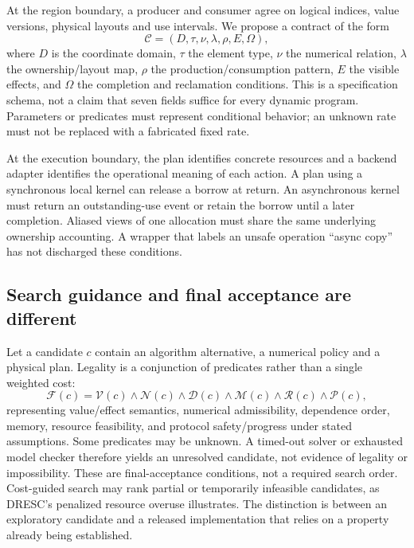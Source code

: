 \documentclass[final,3p,times,authoryear]{elsarticle}
\begin{document}
At the region boundary, a producer and consumer agree on logical indices, value versions, physical layouts and use intervals. We propose a contract of the form
\begin{equation}
 \mathcal C=(D,\tau,\nu,\lambda,\rho,E,\Omega),
\end{equation}
where $D$ is the coordinate domain, $\tau$ the element type, $\nu$ the numerical relation, $\lambda$ the ownership/layout map, $\rho$ the production/consumption pattern, $E$ the visible effects, and $\Omega$ the completion and reclamation conditions. This is a specification schema, not a claim that seven fields suffice for every dynamic program. Parameters or predicates must represent conditional behavior; an unknown rate must not be replaced with a fabricated fixed rate.

At the execution boundary, the plan identifies concrete resources and a backend adapter identifies the operational meaning of each action. A plan using a synchronous local kernel can release a borrow at return. An asynchronous kernel must return an outstanding-use event or retain the borrow until a later completion. Aliased views of one allocation must share the same underlying ownership accounting. A wrapper that labels an unsafe operation ``async copy'' has not discharged these conditions.

\subsection{Search guidance and final acceptance are different}
Let a candidate $c$ contain an algorithm alternative, a numerical policy and a physical plan. Legality is a conjunction of predicates rather than a single weighted cost:
\begin{equation}
 \mathcal F(c)=\mathcal V(c)\land\mathcal N(c)\land\mathcal D(c)
 \land\mathcal M(c)\land\mathcal R(c)\land\mathcal P(c),
\end{equation}
representing value/effect semantics, numerical admissibility, dependence order, memory, resource feasibility, and protocol safety/progress under stated assumptions. Some predicates may be unknown. A timed-out solver or exhausted model checker therefore yields an unresolved candidate, not evidence of legality or impossibility. These are final-acceptance conditions, not a required search order. Cost-guided search may rank partial or temporarily infeasible candidates, as DRESC's penalized resource overuse illustrates. The distinction is between an exploratory candidate and a released implementation that relies on a property already being established.
\end{document}
